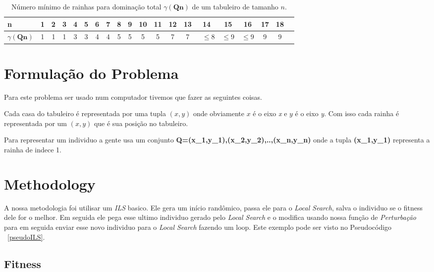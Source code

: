 \documentclass[
	article,			%
	11pt,				%
	oneside,			%
	a4paper,			%
	english,			%
	brazil,				%
	sumario=tradicional
	]{abntex2}
\begin{document}
\begin{table}[ht]
  \caption{Número mínimo de rainhas para dominação total $\gamma(\textbf{Qn})$ de um tabuleiro de tamanho $\textit{n}$.}
  \begin{tabular}{l*{18}{c}r}
    n              & 1 & 2 & 3 & 4 & 5  & 6 & 7 & 8 & 9 & 10 & 11 & 12 & 13 & 14 & 15 & 16 & 17 & 18 \\
    \hline
    $\gamma(\textbf{Qn})$ & 1 & 1 & 1 & 3 & 3 & 4 & 4 & 5 & 5 & 5 & 5 & 7 & 7 & ~$\leq$8 & $\leq$9 & $\leq$9  & 9 & 9 \\
  \end{tabular}
  \label{tabela1}
\end{table}


\section{Formulação do Problema}

Para este problema ser usado num computador tivemos que fazer as seguintes coisas. 

Cada casa do tabuleiro é representada por uma tupla $(x,y)$ onde obviamente $x$ é o eixo \textit{x} e $y$ é o eixo \textit{y}. Com isso cada rainha é representada por um $(x,y)$ que é sua posição no tabuleiro.

Para representar um individuo a gente usa um conjunto \textbf{Q={(x{_{1}},y{_{1}}),(x{_{2}},y{_{2}}),..,(x{_{n}},y{_{n}})}} onde a tupla \textbf{(x{_{1}},y{_{1}})} representa a rainha de indece 1.

\section{Methodology}

A nossa metodologia foi utilisar um \textit{ILS} basico. Ele gera um início randômico, passa ele para o \textit{Local Search}, salva o individuo se o fitness dele for o melhor. Em seguida ele pega esse ultimo individuo gerado pelo \textit{Local Search} e o modifica usando nossa função de \textit{Perturbação} para em seguida enviar esse novo individuo para o \textit{Local Search} fazendo um loop. Este exemplo pode ser visto no Pseudocódigo ~\ref{pseudoILS}.

\subsection{Fitness}
\end{document}
